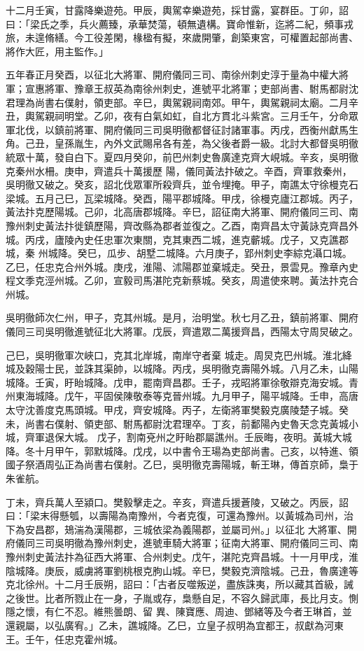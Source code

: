 \begin{pinyinscope}
 十二月壬寅，甘露降樂遊苑。甲辰，輿駕幸樂遊苑，採甘露，宴群臣。丁卯，詔曰：「梁氏之季，兵火薦臻，承華焚蕩，頓無遺構。寶命惟新，迄將二紀，頻事戎旅，未遑脩繕。今工役差閑，椽楹有擬，來歲開肇，創築東宮，可權置起部尚書、將作大匠，用主監作。」



 五年春正月癸酉，以征北大將軍、開府儀同三司、南徐州刺史淳于量為中權大將軍；宣惠將軍、豫章王叔英為南徐州刺史，進號平北將軍；吏部尚書、駙馬都尉沈
 君理為尚書右僕射，領吏部。辛巳，輿駕親祠南郊。甲午，輿駕親祠太廟。二月辛丑，輿駕親祠明堂。乙卯，夜有白氣如虹，自北方貫北斗紫宮。三月壬午，分命眾軍北伐，以鎮前將軍、開府儀同三司吳明徹都督征討諸軍事。丙戌，西衡州獻馬生角。己丑，皇孫胤生，內外文武賜帛各有差，為父後者爵一級。北討大都督吳明徹統眾十萬，發自白下。夏四月癸卯，前巴州刺史魯廣達克齊大峴城。辛亥，吳明徹克秦州水柵。庚申，齊遣兵十萬援歷
 陽，儀同黃法抃破之。辛酉，齊軍救秦州，吳明徹又破之。癸亥，詔北伐眾軍所殺齊兵，並令埋掩。甲子，南譙太守徐槾克石梁城。五月己巳，瓦梁城降。癸酉，陽平郡城降。甲戌，徐槾克廬江郡城。丙子，黃法抃克歷陽城。己卯，北高唐郡城降。辛巳，詔征南大將軍、開府儀同三司、南豫州刺史黃法抃徙鎮歷陽，齊改縣為郡者並復之。乙酉，南齊昌太守黃詠克齊昌外城。丙戌，廬陵內史任忠軍次東關，克其東西二城，進克蘄城。戊子，又克譙郡城，秦
 州城降。癸巳，瓜步、胡墅二城降。六月庚子，郢州刺史李綜克灄口城。乙巳，任忠克合州外城。庚戌，淮陽、沭陽郡並棄城走。癸丑，景雲見。豫章內史程文季克涇州城。乙卯，宣毅司馬湛陀克新蔡城。癸亥，周遣使來聘。黃法抃克合州城。



 吳明徹師次仁州，甲子，克其州城。是月，治明堂。秋七月乙丑，鎮前將軍、開府儀同三司吳明徹進號征北大將軍。戊辰，齊遣眾二萬援齊昌，西陽太守周炅破之。



 己巳，吳明徹軍次峽口，克其北岸城，南岸守者棄
 城走。周炅克巴州城。淮北絳城及穀陽士民，並誅其渠帥，以城降。丙戌，吳明徹克壽陽外城。八月乙未，山陽城降。壬寅，盱眙城降。戊申，罷南齊昌郡。壬子，戎昭將軍徐敬辯克海安城。青州東海城降。戊午，平固侯陳敬泰等克晉州城。九月甲子，陽平城降。壬申，高唐太守沈善度克馬頭城。甲戌，齊安城降。丙子，左衛將軍樊毅克廣陵楚子城。癸未，尚書右僕射、領吏部、駙馬都尉沈君理卒。丁亥，前鄱陽內史魯天念克黃城小城，齊軍退保大城。
 戊子，割南兗州之盱眙郡屬譙州。壬辰晦，夜明。黃城大城降。冬十月甲午，郭默城降。戊戌，以中書令王瑒為吏部尚書。己亥，以特進、領國子祭酒周弘正為尚書右僕射。乙巳，吳明徹克壽陽城，斬王琳，傳首京師，梟于朱雀航。



 丁未，齊兵萬人至潁口。樊毅擊走之。辛亥，齊遣兵援蒼陵，又破之。丙辰，詔曰：「梁末得懸瓠，以壽陽為南豫州，今者克復，可還為豫州。以黃城為司州，治下為安昌郡，鳷湍為漢陽郡，三城依梁為義陽郡，並屬司州。」以征北
 大將軍、開府儀同三司吳明徹為豫州刺史，進號車騎大將軍；征南大將軍、開府儀同三司、南豫州刺史黃法抃為征西大將軍、合州刺史。戊午，湛陀克齊昌城。十一月甲戌，淮陰城降。庚辰，威虜將軍劉桃根克朐山城。辛巳，樊毅克濟陰城。己丑，魯廣達等克北徐州。十二月壬辰朔，詔曰：「古者反噬叛逆，盡族誅夷，所以藏其首級，誡之後世。比者所戮止在一身，子胤或存，梟懸自足，不容久歸武庫，長比月支。惻隱之懷，有仁不忍。維熊曇朗、留
 異、陳寶應、周迪、鄧緒等及今者王琳首，並還親屬，以弘廣宥。」乙未，譙城降。乙巳，立皇子叔明為宜都王，叔獻為河東王。壬午，任忠克霍州城。




\end{pinyinscope}
